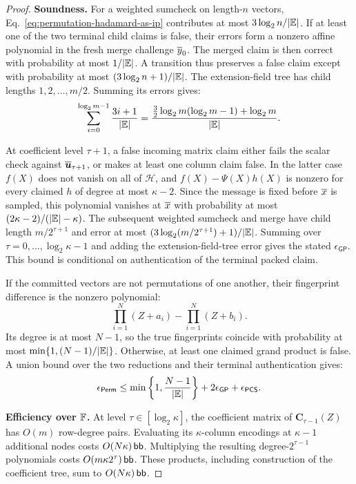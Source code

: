 \begin{proof}
\smallskip\noindent\textbf{Soundness.}
For a weighted sumcheck on length-\(n\) vectors,
Eq.~\eqref{eq:permutation-hadamard-as-ip} contributes at most
\(3\log_2n/|\mathbb{E}|\).
If at least one of the two terminal child claims is false,
their errors form a nonzero affine polynomial in the fresh
merge challenge \(\overline{y}_0\). The merged claim is then correct
with probability at most \(1/|\mathbb{E}|\).
A transition thus preserves a false claim except with
probability at most \((3\log_2n+1)/|\mathbb{E}|\).
The extension-field tree has child lengths
\(1,2,\ldots,m/2\). Summing its errors gives:
\[
    \sum_{i=0}^{\log_2m-1}
       \frac{3i+1}{|\mathbb{E}|}
       =\frac{\frac32\log_2m(\log_2m-1)+\log_2m}
                    {|\mathbb{E}|}.
\]

At coefficient level \(\tau+1\), a false incoming matrix
claim either fails the scalar check against
\(\overline{\bm u}_{\tau+1}\), or makes at least one column claim
false. In the latter case \(f(X)\) does not vanish on all of
\(\mathcal H\), and \(f(X)-\Psi(X)h(X)\) is nonzero for every
claimed \(h\) of degree at most \(\kappa-2\).
Since the message is fixed before \(\overline{x}\) is sampled,
this polynomial vanishes at \(\overline{x}\) with probability at
most \((2\kappa-2)/(|\mathbb{E}|-\kappa)\).
The subsequent weighted sumcheck and merge have child length
\(m/2^{\tau+1}\) and error at most
\((3\log_2(m/2^{\tau+1})+1)/|\mathbb{E}|\).
Summing over \(\tau=0,\ldots,\log_2\kappa-1\) and adding the
extension-field-tree error gives the stated
\(\epsilon_{\mathsf{GP}}\). This bound is conditional on
authentication of the terminal packed claim.

If the committed vectors are not permutations of one another,
their fingerprint difference is the nonzero polynomial:
\[
    \prod_{i=1}^N(Z+a_i)-\prod_{i=1}^N(Z+b_i).
\]
Its degree is at most \(N-1\), so the true fingerprints
coincide with probability at most
\(\min\{1,(N-1)/|\mathbb{E}|\}\).
Otherwise, at least one claimed grand product is false.
A union bound over the two reductions and their terminal
authentication gives:
\[
    \epsilon_{\mathsf{Perm}}
       \leq\min\left\{1,\frac{N-1}{|\mathbb{E}|}\right\}
          +2\epsilon_{\mathsf{GP}}+\epsilon_{\mathsf{PCS}}.
\]

\smallskip\noindent\textbf{Efficiency over \({\mathbb{F}}\).}
At level \(\tau\in[\log_2\kappa]\), the coefficient matrix
of \(\bm C_{\tau-1}(Z)\) has \(O(m)\) row-degree pairs.
Evaluating its \(\kappa\)-column encodings at \(\kappa-1\)
additional nodes costs \(O(N\kappa)\,\mathsf{bb}\).
Multiplying the resulting degree-\(2^{\tau-1}\) polynomials
costs \(O(m\kappa2^\tau)\,\mathsf{bb}\).
These products, including construction of the coefficient
tree, sum to \(O(N\kappa)\,\mathsf{bb}\).


\end{proof}
